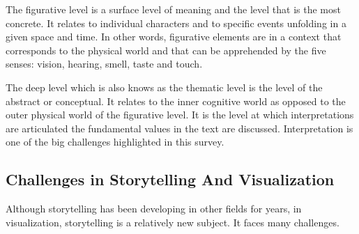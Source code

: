 \documentclass{egpubl}
\begin{document}
The figurative level is a surface level of meaning and the level that is the most concrete. It relates to individual characters and to specific events unfolding in a given space and time. In other words, figurative elements are in a context that corresponds to the physical world and that can be apprehended by the five senses: vision, hearing, smell, taste and touch.

The deep level which is also knows as the thematic level is the level of the abstract or conceptual. It relates to the inner cognitive world as opposed to the outer physical world of the figurative level. It is the level at which interpretations are articulated the fundamental values in the text are discussed. Interpretation is one of the big challenges highlighted in this survey.

\subsection{Challenges in Storytelling And Visualization}
Although storytelling has been developing in other fields for years, in visualization, storytelling is a relatively new subject. It faces many challenges.
\end{document}
